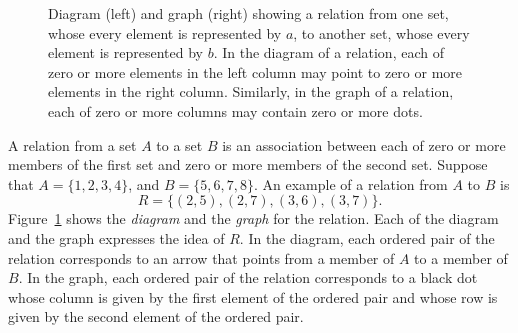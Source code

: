\begin{figure}
\begin{center}
\begin{minipage}{0.8\columnwidth}
      \end{minipage}
   \end{center}
   \caption{Diagram (left) and graph (right) showing a relation from one set,
      whose every element is represented by $a$, to another set, whose every
      element is represented by $b$. In the diagram of a relation, each of zero
      or more elements in the left column may point to zero or more elements in
      the right column. Similarly, in the graph of a relation, each of zero or
      more columns may contain zero or more dots.%
   }
\label{fig:relation}
\end{figure}

\noindent A relation from a set $A$ to a set $B$ is an association between each
of zero or more members of the first set and zero or more members of the second
set.  Suppose that $A = \{1, 2, 3, 4\}$, and $B = \{5, 6, 7, 8\}$. An example
of a relation from $A$ to $B$ is
\begin{equation*}
   R = \{(2,5), (2,7), (3,6), (3,7)\}.
\end{equation*}
Figure~\ref{fig:relation} shows the \emph{diagram} and the \emph{graph} for the
relation. Each of the diagram and the graph expresses the idea of $R$.  In the
diagram, each ordered pair of the relation corresponds to an arrow that points
from a member of $A$ to a member of $B$.  In the graph, each ordered pair of
the relation corresponds to a black dot whose column is given by the first
element of the ordered pair and whose row is given by the second element of the
ordered pair.

